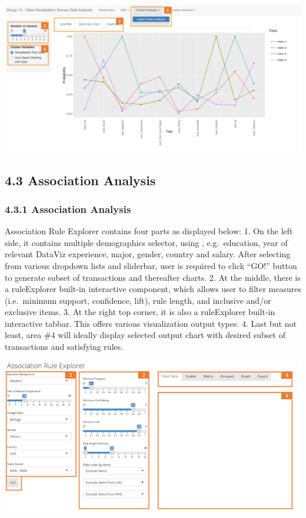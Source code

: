 \documentclass{acm_proc_article-sp}
\begin{document}
\begin{center}\includegraphics[width=1\linewidth]{3} \end{center}

\hypertarget{association-analysis-1}{%
\subsection{4.3 Association Analysis}\label{association-analysis-1}}

\hypertarget{association-analysis-2}{%
\subsubsection{4.3.1 Association
Analysis}\label{association-analysis-2}}

Association Rule Explorer contains four parts as displayed below: 1. On
the left side, it contains multiple demographics selector, using ,
e.g.~education, year of relevant DataViz experience, major, gender,
country and salary. After selecting from various dropdown lists and
sliderbar, user is required to click ``GO!'' button to generate subset
of transactions and thereafter charts. 2. At the middle, there is a
ruleExplorer built-in interactive component, which allows user to filter
measures (i.e.~minimum support, confidence, lift), rule length, and
inclusive and/or exclusive items. 3. At the right top corner, it is also
a ruleExplorer built-in interactive tabbar. This offers various
visualization output types. 4. Last but not least, area \#4 will ideally
display selected output chart with desired subset of transactions and
satisfying rules.

\begin{center}\includegraphics[width=1\linewidth]{4} \end{center}
\end{document}
